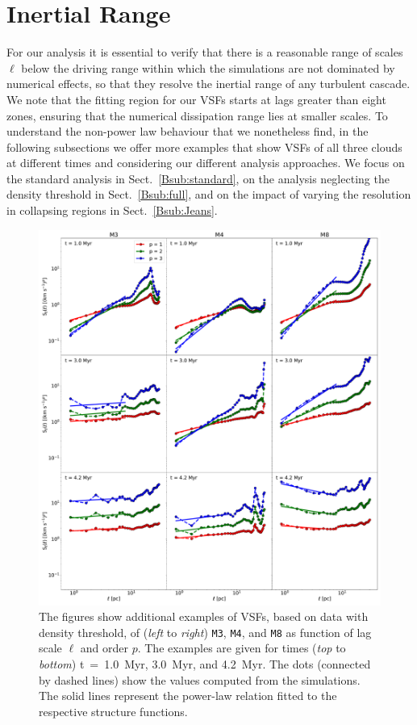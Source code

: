 
\section{Inertial Range}\label{appInertial}


For our analysis it is essential to verify that there is a reasonable range of scales $\ell$ below the driving range within which the simulations are not dominated by numerical effects, so that they resolve the inertial range of any turbulent cascade.  
We note that the fitting region for our VSFs starts at lags greater than eight zones, ensuring that the numerical dissipation range lies at smaller scales.
To understand the non-power law behaviour that we nonetheless find, in the following subsections we offer more examples that show VSFs of all three clouds at different times and considering our different analysis approaches. 
We focus on the standard analysis in Sect.~\ref{Bsub:standard}, on the
analysis neglecting the density threshold in Sect.~\ref{Bsub:full},
and on the impact of varying the resolution in collapsing regions in Sect.~\ref{Bsub:Jeans}.

 	
\begin{figure}
    \centering
    \includegraphics[width=\textwidth]{app_examples_wthres_s_l.pdf}
    \caption{
        The figures show additional examples of VSFs, based on data with density threshold, of (\textit{left} to \textit{right}) \texttt{M3}, \texttt{M4}, and \texttt{M8} as function of lag scale $\ell$ and order $p$. 
        The examples are given for times (\textit{top} to \textit{bottom}) t~=~1.0~Myr, 3.0~Myr, and 4.2~Myr.
        The dots (connected by dashed lines) show the values computed from the simulations. 
        The solid lines represent the power-law relation fitted to the respective structure functions.
    }
    \label{pic:appInertial:examples_with_threshold_s_vs_l}
\end{figure}
 	
